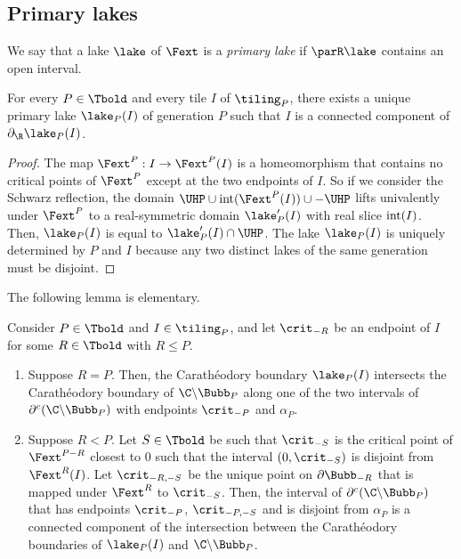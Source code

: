 \documentclass{amsart}
\begin{document}
\subsection{Primary lakes}
\label{ss:primary-lakes}

\begin{definition}
    We say that a lake $\lake$ of $\Fext$ is a \emph{primary lake} if $\parR \lake$ contains an open interval.
\end{definition}

\begin{lemma}
\label{lem:primary-lake}
    For every $P \in \Tbold$ and every tile $I$ of $\tiling_P$, there exists a unique primary lake $\lake_P(I)$ of generation $P$ such that $I$ is a connected component of $\partial_{\R} \lake_P(I)$.
\end{lemma}

\begin{proof}
    The map $\Fext^P: I \to \Fext^P(I)$ is a homeomorphism that contains no critical points of $\Fext^P$ except at the two endpoints of $I$.
    So if we consider the Schwarz reflection, the domain $\UHP \cup \textnormal{int}(\Fext^P(I)) \cup -\UHP$ lifts univalently under $\Fext^P$ to a real-symmetric domain $\lake'_P(I)$ with real slice $\textnormal{int}(I)$.
    Then, $\lake_P(I)$ is equal to $\lake'_P(I) \cap \UHP$.
    The lake $\lake_P(I)$ is uniquely determined by $P$ and $I$ because any two distinct lakes of the same generation must be disjoint.
\end{proof}

The following lemma is elementary.

\begin{lemma}
\label{lem:primary-lakes-and-adjacent-bubbles}
    Consider $P \in \Tbold$ and $I \in \tiling_P$, and let $\crit_{-R}$ be an endpoint of $I$ for some $R \in \Tbold$ with $R\leq P$. 
    \begin{enumerate}
        \item Suppose $R=P$. Then, the Carath\'eodory boundary $\lake_P(I)$ intersects the Carath\'eodory boundary of $\C \backslash \Bubb_P$ along one of the two intervals of $\partial^c(\C \backslash \Bubb_P)$ with endpoints $\crit_{-P}$ and $\alpha_P$.
        \item Suppose $R<P$. 
        Let $S \in \Tbold$ be such that 
        $\crit_{-S}$ is the critical point of $\Fext^{P-R}$ closest to $0$ such that the interval $(0,\crit_{-S})$ is disjoint from $\Fext^R(I)$.
        Let $\crit_{-R,-S}$ be the unique point on $\partial \Bubb_{-R}$ that is mapped under $\Fext^R$ to $\crit_{-S}$.
        Then, the interval of $\partial^c(\C \backslash \Bubb_P)$ that has endpoints $\crit_{-P}$, $\crit_{-P,-S}$ and is disjoint from $\alpha_P$ is a connected component of the intersection between the Carath\'eodory boundaries of $\lake_P(I)$ and $\C \backslash \Bubb_P$.
    \end{enumerate}
\end{lemma}
\end{document}
